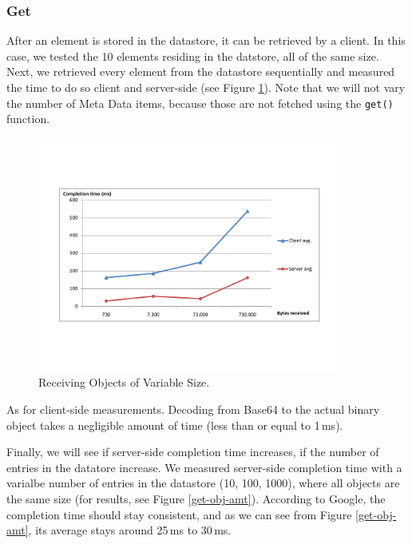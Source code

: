 \subsubsection{Get}
After an element is stored in the datastore, it can be retrieved by a client.
In this case, we tested the 10 elements residing in the datstore, all of the
same size. Next, we retrieved every element from the datastore sequentially and
measured the time to do so client and server-side (see Figure
\ref{get-obj-size}). Note that we will not vary the number of Meta Data items,
because those are not fetched using the \texttt{get()} function.

\begin{figure} %
\begin{center}
\includegraphics[trim=5cm 4cm 5cm 5cm,width=10cm]{./figures/get_obj.pdf}
\caption{Receiving Objects of Variable Size. \label{get-obj-size}}
\end{center}
\end{figure}

As for client-side measurements. Decoding from Base64 to the actual binary
object takes a negligible amount of time (less than or equal to 1\,ms).

Finally, we will see if server-side completion time increases, if the number of
entries in the datatore increase. We measured server-side completion time with a
varialbe number of entries in the datastore (10, 100, 1000), where all objects
are the same size (for results, see Figure \ref{get-obj-amt}). According to
Google, the completion time should stay consistent, and as we can see from
Figure \ref{get-obj-amt}, its average stays around 25\,ms to 30\,ms.

